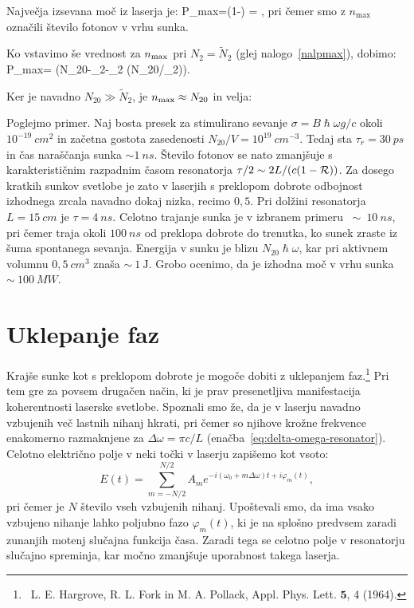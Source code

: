 Največja izsevana moč iz laserja je: 
\beq
P_{\rm max}=\left(1-\right) = 
,
\eeq
pri čemer smo z $n_\textrm{max}$ označili število fotonov v vrhu sunka.

Ko vstavimo še vrednost za $n_{\rm max}$ pri $N_{2}=\tilde{N}_{2}$ (glej 
nalogo~\ref{nalpmax}), dobimo:
\beq
P_{\rm max}=\frac {2\hslash \omega}{\tau} \left(N_{20}-_{2}-_{2}
\ln (N_{20}/_{2})\right)\!\!.
\eeq

Ker je navadno $N_{20}\gg \tilde{N}_2$, je $n_{\rm max} \approx N_{20}$
in velja:

Poglejmo primer. Naj bosta presek za stimulirano sevanje $\sigma=B\hslash \omega g/c$ 
okoli $10^{-19}~\si{cm}^{2}$ in začetna gostota zasedenosti 
$N_{20}/V=10^{19}~\si{cm}^{-3}$.
Tedaj sta $\tau_{r}=30~\si{ps}$ in čas naraščanja
sunka $\sim 1~\si{ns}$. Število fotonov se nato zmanjšuje s
karakterističnim razpadnim časom resonatorja $\tau /2\sim 2L/(c(1-{\cal R}))$. 
Za dosego kratkih sunkov svetlobe je zato v laserjih s preklopom dobrote odbojnost 
izhodnega zrcala navadno dokaj nizka, recimo $0,5$. Pri dolžini resonatorja 
$L=15~\si{cm}$ je $\tau=4~\si{ns}$.
Celotno trajanje sunka je v izbranem primeru $~\sim~10~\si{ns}$, pri
čemer traja okoli $100~\si{ns}$ od preklopa dobrote do trenutka, ko sunek zraste iz šuma
spontanega sevanja. Energija v sunku je blizu $N_{20}\hslash \omega $, kar pri
aktivnem volumnu $0,5~\si{cm}^3$ znaša $\sim~1~\si{\joule}$. Grobo ocenimo, da je
izhodna moč v vrhu sunka $\sim~100~\si{MW}$.

\section{Uklepanje faz}
\label{chap:Uklepanje}
Krajše sunke kot s preklopom dobrote je mogoče dobiti z uklepanjem 
faz.\footnote{~L. E. Hargrove, R. L. Fork in M. A. Pollack, Appl. Phys. Lett. $\mathbf{5}$, 4 (1964).}
Pri tem gre za povsem drugačen način, ki je prav presenetljiva manifestacija 
koherentnosti laserske svetlobe. Spoznali smo že, da je v laserju navadno 
vzbujenih več lastnih nihanj hkrati, pri čemer so njihove krožne frekvence 
enakomerno razmaknjene za $\Delta \omega =\pi c/L$ 
(enačba~\ref{eq:delta-omega-resonator}). Celotno električno
polje v neki točki v laserju zapišemo kot vsoto:
\begin{equation}
E(t)=\sum_{m=-N/2}^{N/2}A_{m}e^{-i(\omega _{0}+m\Delta \omega )t+i\varphi
_{m}(t)},
\label{5.342}
\end{equation}
pri čemer je $N$ število vseh vzbujenih nihanj. Upoštevali smo, da ima vsako
vzbujeno nihanje lahko poljubno fazo $\varphi _{m}(t)$, ki je na splošno predvsem
zaradi zunanjih motenj slučajna funkcija časa. Zaradi tega se
celotno polje v resonatorju slučajno spreminja, kar močno zmanjšuje uporabnost
takega laserja.

